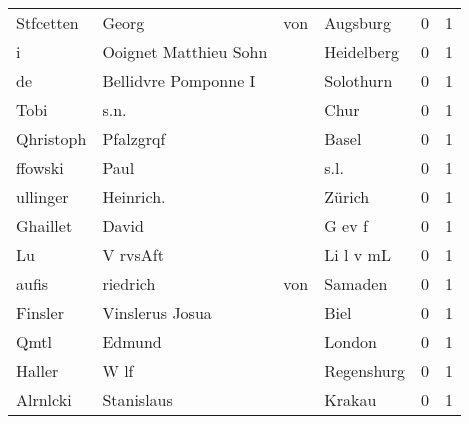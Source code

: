 \begin{tabular}{llllrr}
                Stfcetten &                              Georg &         von &                                    Augsburg &          0 &         1 \\
                        i &              Ooignet Matthieu Sohn &             &                                  Heidelberg &          0 &         1 \\
                       de &               Bellidvre Pomponne I &             &                                   Solothurn &          0 &         1 \\
                     Tobi &                               s.n. &             &                                        Chur &          0 &         1 \\
                Qhristoph &                          Pfalzgrqf &             &                                       Basel &          0 &         1 \\
                  ffowski &                               Paul &             &                                        s.l. &          0 &         1 \\
                 ullinger &                          Heinrich. &             &                                      Zürich &          0 &         1 \\
                 Ghaillet &                              David &             &                                      G ev f &          0 &         1 \\
                       Lu &                           V rvsAft &             &                                   Li l v mL &          0 &         1 \\
                    aufis &                           riedrich &         von &                                     Samaden &          0 &         1 \\
                  Finsler &                    Vinslerus Josua &             &                                        Biel &          0 &         1 \\
                     Qmtl &                             Edmund &             &                                      London &          0 &         1 \\
                   Haller &                               W lf &             &                                  Regenshurg &          0 &         1 \\
                 Alrnlcki &                         Stanislaus &             &                                      Krakau &          0 &         1 \\

\end{tabular}
